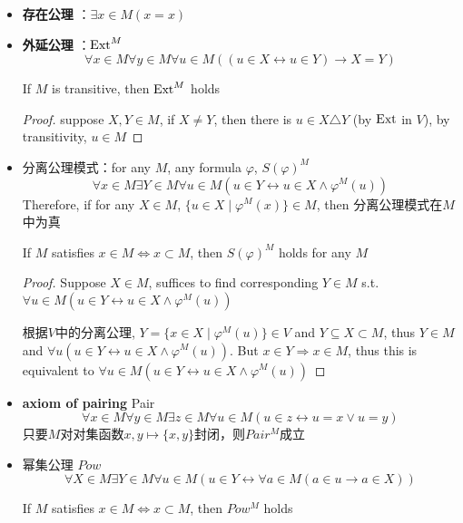 \documentclass[11pt]{article}
\begin{document}
\begin{itemize}
\item \textbf{存在公理} ：\(\exists x\in M(x=x)\)
\item \textbf{外延公理} ：\(\operatorname{Ext}^M\)
\begin{equation*}
\forall x\in M\forall y\in M\forall u\in M((u\in X\leftrightarrow u\in Y)\to X=Y)
\end{equation*}
\begin{lemma}[]
If \(M\) is transitive, then \(\operatorname{Ext}^M\) holds
\end{lemma}

\begin{proof}
suppose \(X,Y\in M\), if \(X\neq Y\), then there is \(u\in X\triangle Y\) (by \(\operatorname{Ext}\) in \(V\)), by
transitivity, \(u\in M\)
\end{proof}
\item 分离公理模式：for any \(M\), any formula \(\varphi\), \(S(\varphi)^M\)
\begin{equation*}
\forall x\in M\exists Y\in M\forall u\in M(u\in Y\leftrightarrow u\in X\wedge\varphi^M(u))
\end{equation*}
Therefore, if for any \(X\in M\), \(\{u\in X\mid\varphi^M(x)\}\in M\), then 分离公理模式在\(M\)中为真
\begin{lemma}[]
If \(M\) satisfies \(x\in M\Leftrightarrow x\subset M\), then \(S(\varphi)^M\) holds for any \(M\)
\end{lemma}

\begin{proof}
Suppose \(X\in M\), suffices to find corresponding \(Y\in M\) s.t. \(\forall u\in M(u\in Y\leftrightarrow u\in X\wedge\varphi^M(u))\)

根据\(V\)中的分离公理, \(Y=\{x\in X\mid\varphi^M(u)\}\in V\) and \(Y\subseteq X\subset M\), thus \(Y\in M\) and
\(\forall u(u\in Y\leftrightarrow u\in X\wedge\varphi^M(u))\). But \(x\in Y\Rightarrow x\in M\), thus this is equivalent to
\(\forall u\in M(u\in Y\leftrightarrow u\in X\wedge\varphi^M(u))\)
\end{proof}
\item \textbf{axiom of pairing} Pair
\begin{equation*}
\forall x\in M\forall y\in M\exists z\in M\forall u\in M(u\in z\leftrightarrow u= x\vee u=y)
\end{equation*}
只要\(M\)对对集函数\(x,y\mapsto\{x,y\}\)封闭，则\(Pair^M\)成立
\item 幂集公理 \(Pow\)
\begin{equation*}
\forall X\in M\exists Y\in M\forall u\in M(u\in Y\leftrightarrow\forall a\in M(a\in u\to a\in X))
\end{equation*}
\begin{lemma}[]
If \(M\) satisfies \(x\in M\Leftrightarrow x\subset M\), then \(Pow^M\) holds
\end{lemma}


\end{itemize}
\end{document}
